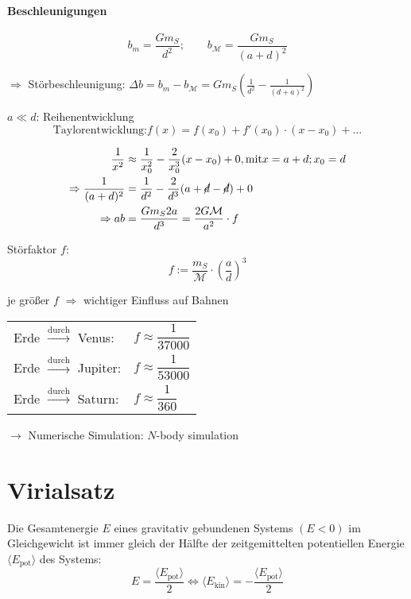 \paragraph{Beschleunigungen}
\[ b_m = \frac{G m_S}{d^2}; \qquad b_{\mathcal{M}} = \frac{G m_S}{(a + d)^2} \]

$\Rightarrow$ Störbeschleunigung: $\Delta b = b_m - b_{\mathcal M} = G m_S (\frac{1}{d^2} - \frac{1}{(d + a)^2})$

$a \ll d$: Reihenentwicklung
\[ \boxed{\text{Taylorentwicklung:} f(x) = f(x_0) + f'(x_0) \cdot (x - x_0) + \dots} \]

\begin{align*}
    \frac{1}{x^2} &\approx \frac{1}{x_0^2} - \frac{2}{x_0^3} (x - x_0) + 0, \text{mit} x = a + d; x_0 = d \\
    \Rightarrow \frac{1}{(a+d)^2} &= \frac{1}{d^2} - \frac{2}{d^3} (a + \cancel{d} - \cancel{d}) + 0 \\
    \Rightarrow a b &= \frac{Gm_S 2 a}{d^3} = \frac{2 G \mathcal{M}}{a^2} \cdot f
\end{align*}

\begin{definition}
    Störfaktor $f$: \[ \boxed{f := \frac{m_S}{\mathcal{M}} \cdot \left(\frac{a}{d}\right)^3} \]
\end{definition}

je größer $f$ $\Rightarrow$ wichtiger Einfluss auf Bahnen
\begin{center}
\begin{tabular}{ll}
    Erde $\xrightarrow{\text{durch}}$ Venus: & $f \approx \dfrac{1}{37000}$ \\
    Erde $\xrightarrow{\text{durch}}$ Jupiter: & $f \approx \dfrac{1}{53000}$ \\
    Erde $\xrightarrow{\text{durch}}$ Saturn: & $f \approx \dfrac{1}{360}$
\end{tabular}
\end{center}

$\rightarrow$ Numerische Simulation: $N$-body simulation

\section{Virialsatz}
\begin{framed}
    \begin{theorem}
        Die Gesamtenergie $E$ eines gravitativ gebundenen Systems $(E < 0)$ im 
        Gleichgewicht ist immer gleich der Hälfte der zeitgemittelten potentiellen
        Energie $\langle E_{\mathrm{pot}} \rangle$ des Systems:
        \[ E = \frac{\langle E_{\mathrm{pot}} \rangle}{2} \Leftrightarrow \langle E_{\mathrm{kin}} \rangle = - \frac{\langle E_{\mathrm{pot}} \rangle}{2}\]
    \end{theorem}
\end{framed}


